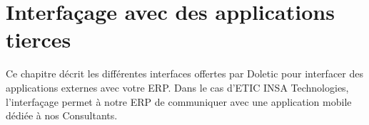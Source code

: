 \chapter{Interfaçage avec des applications tierces}

Ce chapitre décrit les différentes interfaces offertes par Doletic pour interfacer des applications externes avec votre ERP. Dans le cas d'ETIC INSA Technologies, l'interfaçage permet à notre ERP de communiquer avec une application mobile dédiée à nos Consultants.